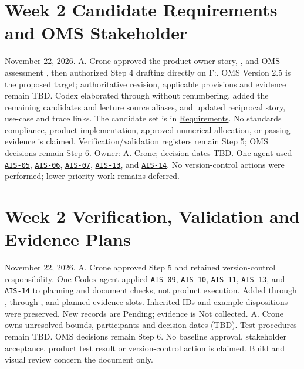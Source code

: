 \section{Week 2 Candidate Requirements and OMS Stakeholder}
November 22, 2026. A. Crone approved the product-owner story,
, and OMS assessment , then authorized
Step 4 drafting directly on F:. OMS Version 2.5 is the proposed target;
authoritative revision, applicable provisions and evidence remain TBD.
Codex elaborated  through 
without renumbering, added the remaining candidates and lecture source aliases,
and updated reciprocal story, use-case and trace links.
The candidate set is in \hyperref[Section:SP800CandidateRequirements]{Requirements}.
No standards compliance, product implementation, approved numerical allocation,
or passing evidence is claimed. Verification/validation registers remain Step 5;
OMS decisions remain Step 6. Owner: A. Crone; decision dates TBD.
One agent used \hyperref[Skill:AIS-05]{\texttt{AIS-05}},
\hyperref[Skill:AIS-06]{\texttt{AIS-06}}, \hyperref[Skill:AIS-07]{\texttt{AIS-07}},
\hyperref[Skill:AIS-13]{\texttt{AIS-13}}, and \hyperref[Skill:AIS-14]{\texttt{AIS-14}}.
No version-control actions were performed; lower-priority work remains deferred.

\section{Week 2 Verification, Validation and Evidence Plans}
November 22, 2026. A. Crone approved Step 5 and retained version-control responsibility.
One Codex agent applied \hyperref[Skill:AIS-09]{\texttt{AIS-09}},
\hyperref[Skill:AIS-10]{\texttt{AIS-10}}, \hyperref[Skill:AIS-11]{\texttt{AIS-11}},
\hyperref[Skill:AIS-13]{\texttt{AIS-13}}, and \hyperref[Skill:AIS-14]{\texttt{AIS-14}}
to planning and document checks, not product execution.
Added  through ,
 through , and
\hyperref[Table:PlannedProjectEvidence]{planned evidence slots}.
Inherited IDs and example dispositions were preserved. New records are Pending;
evidence is Not collected. A. Crone owns unresolved bounds, participants and
decision dates (TBD). Test procedures remain TBD. OMS decisions remain Step 6.
No baseline approval, stakeholder acceptance, product test result or version-control
action is claimed. Build and visual review concern the document only.


